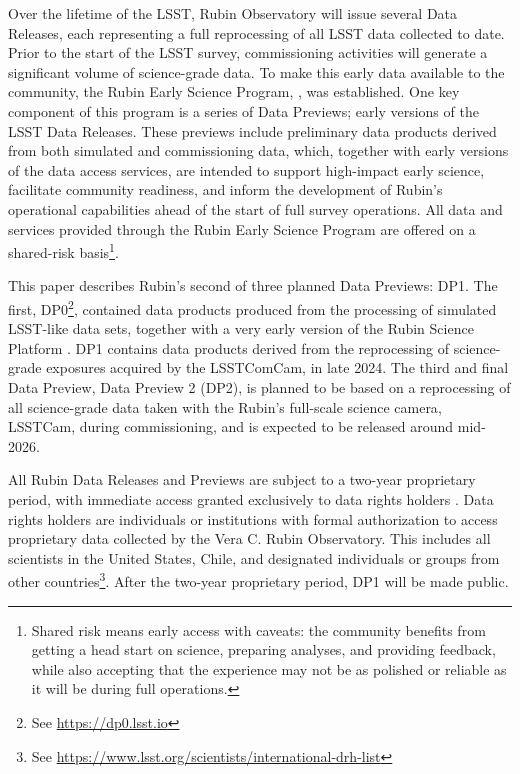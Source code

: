 Over the lifetime of the \gls{LSST}, Rubin Observatory will issue several Data Releases, each representing a full reprocessing of all \gls{LSST} data collected to date.
Prior to the start of the \gls{LSST} survey, commissioning activities will generate a significant volume of science-grade data.
To make this early data available to the community, the Rubin Early Science Program, \citep{RTN-011}, was established.
One key component of this program is a series of Data Previews; early versions of the \gls{LSST} Data Releases.
These previews include preliminary data products derived from both simulated and commissioning data, which, together with early versions of the data access services, are intended to support high-impact early science, facilitate community readiness, and inform the development of Rubin’s operational capabilities ahead of the start of full survey operations.
All data and services provided through the Rubin Early Science Program are offered on a shared-risk basis\footnote{Shared risk means early access with caveats: the community benefits from getting a head start on science, preparing analyses, and providing feedback, while also accepting that the experience may not be as polished or reliable as it will be during full operations.}.

This paper describes Rubin's second of three planned Data Previews: \gls{DP1}.
The first, \gls{DP0}\footnote{See \url{https://dp0.lsst.io}}, contained data products produced from the processing of simulated \gls{LSST}-like data sets, together with a very early version of the Rubin \gls{Science Platform} \citep{LSE-319}.
\gls{DP1} contains data products derived from the reprocessing of science-grade exposures acquired by the \gls{LSSTComCam}, in late 2024.
The third and final Data Preview,  Data Preview 2 (\gls{DP2}), is planned to be based on a reprocessing of all science-grade data taken with the Rubin's full-scale science \gls{camera}, \gls{LSSTCam}, during commissioning, and is expected to be released around mid-2026.

All Rubin Data Releases and Previews are subject to a two-year proprietary period, with immediate access granted exclusively to data rights holders \citep{rdo-013}.
Data rights holders are individuals or institutions with formal authorization to access proprietary data collected by the Vera C. Rubin Observatory.
This includes all scientists in the United States, Chile, and designated individuals or groups from other countries\footnote{See \url{https://www.lsst.org/scientists/international-drh-list}}.
After the two-year proprietary period, \gls{DP1} will be made public.

